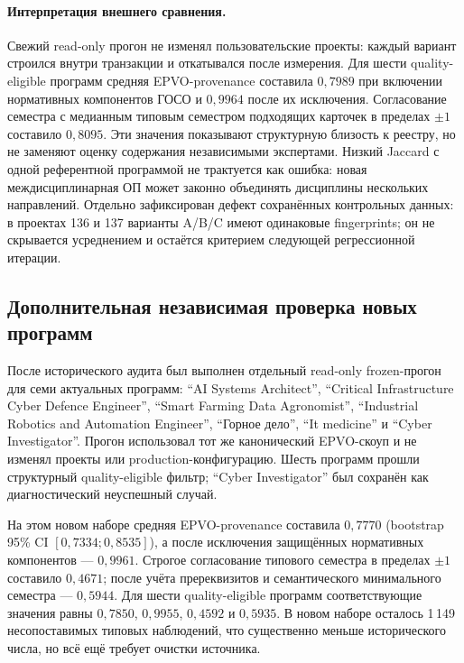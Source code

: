 \documentclass[twoside,11pt]{article}
\begin{document}
\paragraph{Интерпретация внешнего сравнения.}
Свежий read-only прогон не изменял пользовательские проекты: каждый вариант
строился внутри транзакции и откатывался после измерения. Для шести quality-eligible
программ средняя EPVO-provenance составила $0{,}7989$ при включении нормативных
компонентов ГОСО и $0{,}9964$ после их исключения. Согласование семестра с
медианным типовым семестром подходящих карточек в пределах $\pm1$ составило
$0{,}8095$. Эти значения показывают структурную близость к реестру, но не
заменяют оценку содержания независимыми экспертами. Низкий Jaccard с одной
референтной программой не трактуется как ошибка: новая междисциплинарная ОП
может законно объединять дисциплины нескольких направлений. Отдельно зафиксирован
дефект сохранённых контрольных данных: в проектах 136 и 137 варианты A/B/C имеют
одинаковые fingerprints; он не скрывается усреднением и остаётся критерием
следующей регрессионной итерации.

\subsection{Дополнительная независимая проверка новых программ}

После исторического аудита был выполнен отдельный read-only frozen-прогон для семи актуальных программ: ``AI Systems Architect'', ``Critical Infrastructure Cyber Defence Engineer'', ``Smart Farming Data Agronomist'', ``Industrial Robotics and Automation Engineer'', ``Горное дело'', ``It medicine'' и ``Cyber Investigator''. Прогон использовал тот же канонический EPVO-скоуп и не изменял проекты или production-конфигурацию. Шесть программ прошли структурный quality-eligible фильтр; ``Cyber Investigator'' был сохранён как диагностический неуспешный случай.

На этом новом наборе средняя EPVO-provenance составила $0{,}7770$ (bootstrap 95\% CI $[0{,}7334;0{,}8535]$), а после исключения защищённых нормативных компонентов --- $0{,}9961$. Строгое согласование типового семестра в пределах $\pm1$ составило $0{,}4671$; после учёта пререквизитов и семантического минимального семестра --- $0{,}5944$. Для шести quality-eligible программ соответствующие значения равны $0{,}7850$, $0{,}9955$, $0{,}4592$ и $0{,}5935$. В новом наборе осталось 1\,149 несопоставимых типовых наблюдений, что существенно меньше исторического числа, но всё ещё требует очистки источника.
\end{document}
